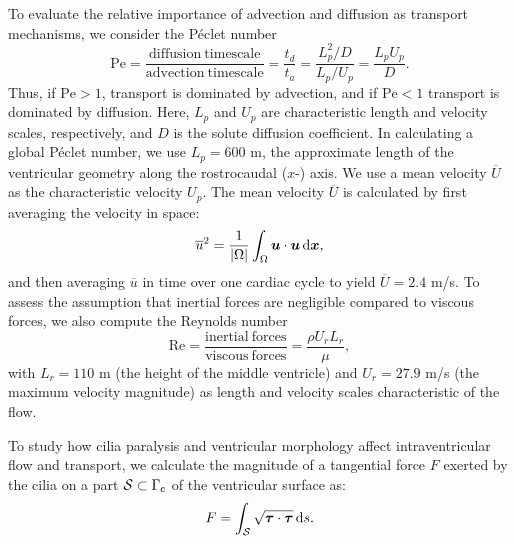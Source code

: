 \documentclass{WileyMSP-template}
\begin{document}
To evaluate the relative importance of advection and
diffusion as transport mechanisms, we consider the Péclet number
\begin{equation*}
    \mathrm{Pe} = \frac{\mathrm{diffusion \ timescale}}{\mathrm{advection \ timescale}}
    = \frac{t_d}{t_a} = \frac{L_p^2/D}{L_p/U_p} = \frac{L_p U_p}{D}.
\end{equation*}
Thus, if $\mathrm{Pe} > 1$, transport is dominated by advection,
and if $\mathrm{Pe} < 1$ transport is dominated by diffusion.
Here, $L_p$ and $U_p$ are characteristic length and velocity scales,
respectively, and $D$ is the solute diffusion coefficient.
In calculating a global Péclet number, we use $L_p=600$ \textmu m, the approximate length of the
ventricular geometry along the rostrocaudal ($x$-) axis.
We use a mean velocity $\overline{U}$ as the characteristic velocity $U_p$.
The mean velocity $\overline{U}$ is calculated by first averaging the velocity in space:
\begin{equation*}
    \overline{u}^2 = \frac{1}{|\Omega|}\int_{\Omega}\bm{u}\cdot\bm{u}\, \mathrm d\bm{x},
\end{equation*}
and then averaging $\overline{u}$ in time over one cardiac cycle to yield $\overline{U} = 2.4$ \textmu m/s.
To assess the assumption that inertial forces are negligible compared to
viscous forces, we also compute the Reynolds number
\begin{equation*}
    \mathrm{Re} = \frac{\mathrm{inertial \ forces}}{\mathrm{viscous \ forces}} = \frac{\rho U_r L_r}{\mu},
\end{equation*}
with $L_r = 110$ \textmu m (the height of the middle ventricle) and
$U_r = 27.9$ \textmu m/s (the maximum velocity magnitude)
as length and velocity scales characteristic of the flow.

To study how cilia paralysis and ventricular morphology affect intraventricular
flow and transport, we calculate the magnitude of a tangential force $F$ 
exerted by the cilia on a part $\mathcal{S}\subset\Gamma_{\mathrm{c}}$ of the ventricular surface as:
\begin{equation}
    F = \int_{\mathcal{S}}\sqrt{\bm{\tau}\cdot\bm{\tau}}\,\mathrm ds.
    \label{eq:tangential_force_calculation}
\end{equation}

\end{document}
